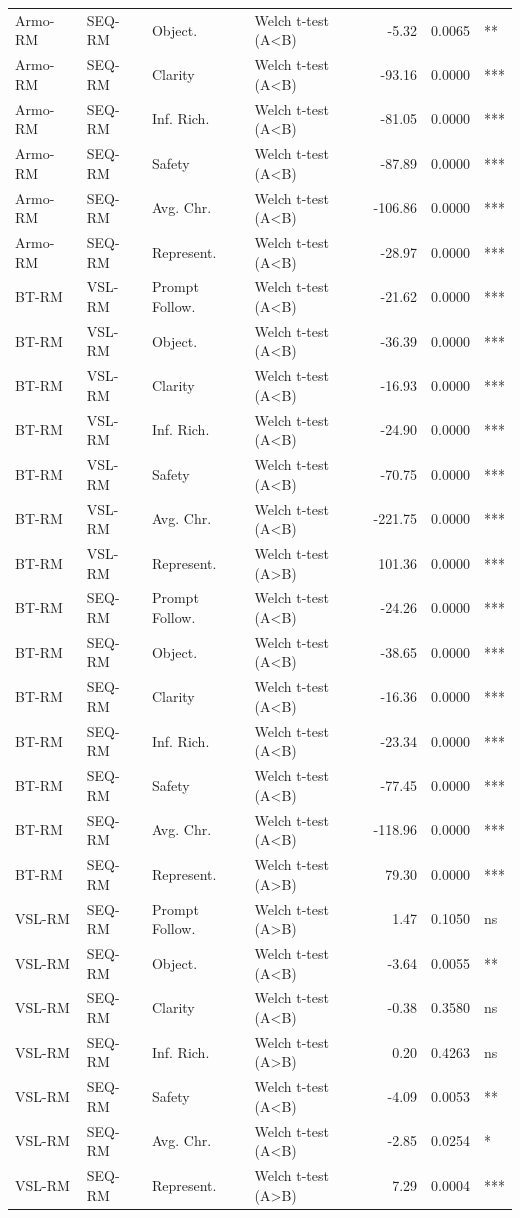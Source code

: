 \documentclass{article}
\begin{document}
\begin{longtable}{llllrrl}
Armo-RM & SEQ-RM & Object. & Welch t-test (A<B) & -5.32 & 0.0065 & ** \\
Armo-RM & SEQ-RM & Clarity & Welch t-test (A<B) & -93.16 & 0.0000 & *** \\
Armo-RM & SEQ-RM & Inf. Rich. & Welch t-test (A<B) & -81.05 & 0.0000 & *** \\
Armo-RM & SEQ-RM & Safety & Welch t-test (A<B) & -87.89 & 0.0000 & *** \\
Armo-RM & SEQ-RM & Avg. Chr. & Welch t-test (A<B) & -106.86 & 0.0000 & *** \\
Armo-RM & SEQ-RM & Represent. & Welch t-test (A<B) & -28.97 & 0.0000 & *** \\
BT-RM & VSL-RM & Prompt Follow. & Welch t-test (A<B) & -21.62 & 0.0000 & *** \\
BT-RM & VSL-RM & Object. & Welch t-test (A<B) & -36.39 & 0.0000 & *** \\
BT-RM & VSL-RM & Clarity & Welch t-test (A<B) & -16.93 & 0.0000 & *** \\
BT-RM & VSL-RM & Inf. Rich. & Welch t-test (A<B) & -24.90 & 0.0000 & *** \\
BT-RM & VSL-RM & Safety & Welch t-test (A<B) & -70.75 & 0.0000 & *** \\
BT-RM & VSL-RM & Avg. Chr. & Welch t-test (A<B) & -221.75 & 0.0000 & *** \\
BT-RM & VSL-RM & Represent. & Welch t-test (A>B) & 101.36 & 0.0000 & *** \\
BT-RM & SEQ-RM & Prompt Follow. & Welch t-test (A<B) & -24.26 & 0.0000 & *** \\
BT-RM & SEQ-RM & Object. & Welch t-test (A<B) & -38.65 & 0.0000 & *** \\
BT-RM & SEQ-RM & Clarity & Welch t-test (A<B) & -16.36 & 0.0000 & *** \\
BT-RM & SEQ-RM & Inf. Rich. & Welch t-test (A<B) & -23.34 & 0.0000 & *** \\
BT-RM & SEQ-RM & Safety & Welch t-test (A<B) & -77.45 & 0.0000 & *** \\
BT-RM & SEQ-RM & Avg. Chr. & Welch t-test (A<B) & -118.96 & 0.0000 & *** \\
BT-RM & SEQ-RM & Represent. & Welch t-test (A>B) & 79.30 & 0.0000 & *** \\
VSL-RM & SEQ-RM & Prompt Follow. & Welch t-test (A>B) & 1.47 & 0.1050 & ns \\
VSL-RM & SEQ-RM & Object. & Welch t-test (A<B) & -3.64 & 0.0055 & ** \\
VSL-RM & SEQ-RM & Clarity & Welch t-test (A<B) & -0.38 & 0.3580 & ns \\
VSL-RM & SEQ-RM & Inf. Rich. & Welch t-test (A>B) & 0.20 & 0.4263 & ns \\
VSL-RM & SEQ-RM & Safety & Welch t-test (A<B) & -4.09 & 0.0053 & ** \\
VSL-RM & SEQ-RM & Avg. Chr. & Welch t-test (A<B) & -2.85 & 0.0254 & * \\
VSL-RM & SEQ-RM & Represent. & Welch t-test (A>B) & 7.29 & 0.0004 & *** \\
\end{longtable}
\end{document}
